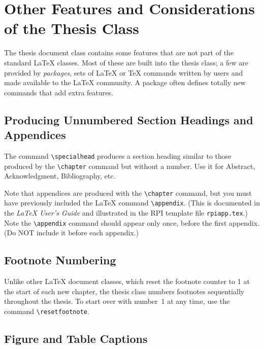 \documentclass[letterpaper,11pt]{article}
\begin{document}
\section{Other Features and Considerations of the Thesis Class}

The thesis document class contains some features that are not part of the standard {\LaTeX}
classes. Most of these are built into the thesis class; a few are provided by \emph{packages}, sets of
{\LaTeX} or {\TeX} commands written by users and made available to the {\LaTeX} community. A
package often defines totally new commands that add extra features.

\subsection{Producing Unnumbered Section Headings and Appendices}

The command \verb|\specialhead| produces a section heading similar to those produced by the
\verb|\chapter| command but without a number. Use it for Abstract, Acknowledgment, Bibliography, etc.

Note that appendices are produced with the \verb|\chapter| command, but you must have previously
included the {\LaTeX} command \verb|\appendix|. (This is documented in the \textit{{\LaTeX} User's Guide} and
illustrated in the RPI template file \verb|rpiapp.tex|.) Note the \verb|\appendix| command should appear
only once, before the first appendix. (Do NOT include it before each appendix.)

\subsection{Footnote Numbering}

Unlike other {\LaTeX} document classes, which reset the footnote counter to 1 at the start of each
new chapter, the thesis class numbers footnotes sequentially throughout the thesis. To start
over with number~1 at any time, use the command \verb|\resetfootnote|.

\subsection{Figure and Table Captions}
\end{document}
